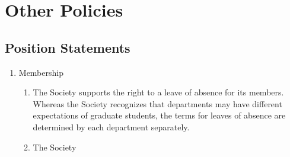 \section{Other Policies}
\subsection{Position Statements}
\begin{enumerate}
\item Membership
\begin{enumerate}
\item The Society supports the right to a leave of absence for its members. Whereas the Society recognizes that departments may have different expectations of graduate students, the terms for leaves of absence are determined by each department separately.
\item The Society
\end{enumerate}
\end{enumerate}
